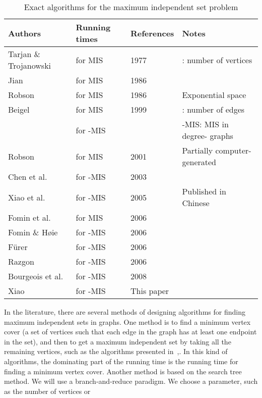 \documentclass[runningheads]{llncs}
\begin{document}
\begin{table}[htp]\label{table1}
\begin{tabular}{|l|l|l|l|}\hline
\textbf{Authors} & \textbf{Running times} &\textbf{References}& \textbf{Notes}\\
\hline \hline Tarjan \& Trojanowski & for MIS&
1977~\cite{Tarjan:IS}&: number of vertices\\ \hline Jian &  for MIS& 1986~\cite{Jian:Is}&\\
\hline Robson & for MIS &1986~\cite{Robson:IS}&Exponential space\\
\hline
 Beigel &  for MIS
& 1999~\cite{Beigel:is}&: number of edges\\
& for -MIS & &-MIS: MIS in degree- graphs\\
 \hline Robson & for MIS &2001~\cite{Robson:IS_1}&Partially computer-generated\\
 \hline Chen et al. &  for -MIS & 2003~\cite{Chen:labeled3vc}&\\
\hline Xiao et al. &  for -MIS & 2005~\cite{xiao:IS3}&Published in Chinese\\
\hline Fomin et al. &  for MIS & 2006~\cite{Fomin:is}&\\
\hline Fomin \& H\o ie &  for -MIS & 2006~\cite{Fomin:cubicgraph}&\\
\hline F{\"u}rer &  for -MIS & 2006~\cite{Furer:ISsparse}&\\
\hline Razgon &  for -MIS & 2006~\cite{Razgon:3IS}&\\
\hline Bourgeois et al. &  for -MIS &
2008~\cite{Bourgeois:3IS} &\\
\hline Xiao & for -MIS& This paper & \\
\hline
\end{tabular}
\vspace{3mm} \caption{Exact algorithms for the maximum independent
set problem}
\end{table}
In the literature, there are several methods of designing
algorithms for finding maximum independent sets in graphs. One
method is to find a minimum vertex cover (a set of vertices such
that each edge in the graph has at least one endpoint in the set),
and then to get a maximum independent set by taking all the
remaining vertices, such as the algorithms presented
in~\cite{Chen:labeled3vc},\cite{VC2005}. In this kind of
algorithms, the dominating part of the running time is the running
time for finding a minimum vertex cover. Another method is based
on the search tree method. We will use a branch-and-reduce
paradigm. We choose a parameter, such as the number of vertices or
\end{document}

